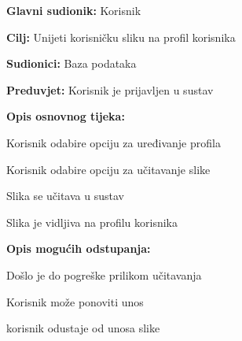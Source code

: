     \noindent {}
    \begin{packed_item}
    	
    	\item \textbf{Glavni sudionik: }
    	Korisnik 
    	\item  \textbf{Cilj:} Unijeti korisničku sliku na profil korisnika
    	\item  \textbf{Sudionici:} Baza podataka
    	\item  \textbf{Preduvjet:} Korisnik je prijavljen u sustav
    	\item  \textbf{Opis osnovnog tijeka:}
    	
    	\item[] \begin{packed_enum}
    		
    		\item Korisnik odabire opciju za uređivanje profila
    		\item Korisnik odabire opciju za učitavanje slike
    		\item Slika se učitava u sustav
    		\item Slika je vidljiva na profilu korisnika
    		
    	\end{packed_enum}
    	
    	\item  \textbf{Opis mogućih odstupanja:}
    	
    	\item[] \begin{packed_item}
    		
    		\item[2.a] Došlo je do pogreške prilikom učitavanja
    		\item[] \begin{packed_enum}
    			
    			\item Korisnik može ponoviti unos 
    			\item korisnik odustaje od unosa slike
    			
    		\end{packed_enum}
    		
    	\end{packed_item}
    \end{packed_item}

